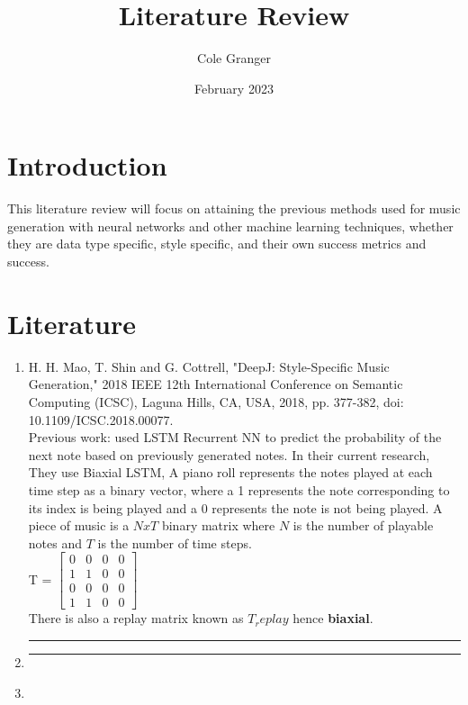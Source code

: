 \documentclass{article}
\title{Literature Review}
\author{Cole Granger}
\date{February 2023}
\begin{document}
\maketitle

\section{Introduction}
This literature review will focus on attaining the previous methods used for music generation with neural networks and other machine learning techniques, whether they are data type specific, style specific, and their own success metrics and success.

\section{Literature}
\begin{enumerate}
    \item H. H. Mao, T. Shin and G. Cottrell, "DeepJ: Style-Specific Music Generation," 2018 IEEE 12th International Conference on Semantic Computing (ICSC), Laguna Hills, CA, USA, 2018, pp. 377-382, doi: 10.1109/ICSC.2018.00077. 
    \vspace{0.1cm}\\
    Previous work: used LSTM Recurrent NN to predict the probability of the next note based on previously generated notes. In their current
    research, They use Biaxial LSTM, A piano roll represents the notes played at each time step as a binary vector, where a 1 represents the note corresponding to its index is being played and a 0 represents the note is not being played. A piece of music is a $NxT$ binary matrix where $N$ is the number of playable notes and $T$ is the number of time steps.\\
    T = $\begin{bmatrix}
    0 & 0 & 0 & 0\\
    1 & 1 & 0 & 0\\
    0 & 0 & 0 & 0\\
    1 & 1 & 0 & 0
    \end{bmatrix}$\\
    There is also a replay matrix known as $T_replay$ hence \textbf{biaxial}.\\
\noindent\rule{\textwidth}{1pt}
    \item
\noindent\rule{\textwidth}{1pt}
    \item
\end{enumerate}
\end{document}
